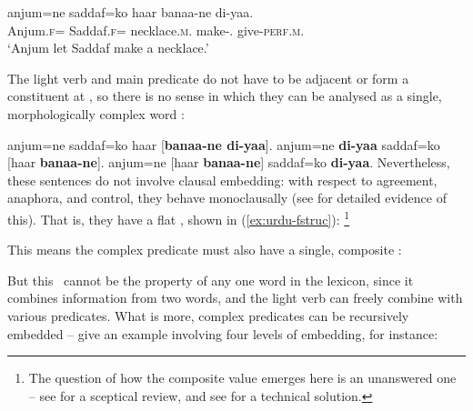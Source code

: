 \documentclass[output=paper]{langscibook}
\begin{document}
\ea\label{urdupermissiveinitial}
\gll anjum=ne saddaf=ko haar banaa-ne di-yaa.\\
     Anjum.\textsc{f}=\ERG{} Saddaf.\textsc{f}=\DAT{} necklace.\textsc{m}.\NOM{} make-\INF.\OBL{} give-\textsc{perf}.\textsc{m}.\SG{}
     \\
\glt `Anjum let Saddaf make a necklace.'
\z

The light verb and main predicate do not have to be adjacent or form a
constituent at \cstruc, so there is no sense in which they can be analysed as a
single, morphologically complex word \citep[46]{Butt1995}:

\ea\label{ex:urdu-scrambling}
\ea anjum=ne saddaf=ko haar [\textbf{banaa-ne di-yaa}].
\ex anjum=ne \textbf{di-yaa} saddaf=ko [haar \textbf{banaa-ne}].
\ex anjum=ne [haar \textbf{banaa-ne}] saddaf=ko \textbf{di-yaa}.
\z
\z
%
Nevertheless, these sentences do not involve clausal embedding: with respect to
agreement, anaphora, and control, they behave monoclausally (see
\citealt[36--43]{Butt1995} for detailed evidence of this). That is, they have a
flat \fstruc, shown in (\ref{ex:urdu-fstruc}):%
%
\footnote{The question of how the composite \PRED value emerges here is an
  unanswered one -- see \citet[sec.~2]{Lowe2015} for a sceptical review,
  and see \citet[sec. 4]{asudeh-rafieerad-lfg23} for a technical solution.
  }
%

\ea\label{ex:urdu-fstruc}
\z
%
This means the complex predicate must also have a single, composite \astruc:


\ea {}
\z
%
But this \astruc\ cannot be the property of any one word in the lexicon, since
it combines information from two words, and the light verb can freely combine
with various predicates. What is more, complex predicates can be recursively
embedded -- \citet{buttetal09} give an example involving four levels of
embedding, for instance:
\end{document}
